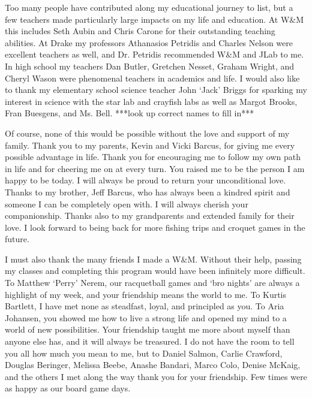 \documentclass[../main.tex]{subfiles}
\begin{document}
\begin{singlespace}
{{\begin{flushleft}
Too many people have contributed along my educational journey to list, but a few teachers made particularly large impacts on my life and education. At W$\&$M this includes Seth Aubin and Chris Carone for their outstanding teaching abilities. At Drake my professors Athanasios Petridis and Charles Nelson were excellent teachers as well, and Dr. Petridis recommended W$\&$M and JLab to me. In high school my teachers Dan Butler, Gretchen Nesset, Graham Wright, and Cheryl Wason were phenomenal teachers in academics and life. I would also like to thank my elementary school science teacher John `Jack' Briggs for sparking my interest in science with the star lab and crayfish labs as well as Margot Brooks, Fran Buesgens, and Ms. Bell. ***look up correct names to fill in***

\end{flushleft}
} %

{\parindent0pt %
\begin{flushleft}
                                                                                 
Of course, none of this would be possible without the love and support of my family. Thank you to my parents, Kevin and Vicki Barcus, for giving me every possible advantage in life. Thank you for encouraging me to follow my own path in life and for cheering me on at every turn. You raised me to be the person I am happy to be today. I will always be proud to return your unconditional love. Thanks to my brother, Jeff Barcus, who has always been a kindred spirit and someone I can be completely open with. I will always cherish your companionship. Thanks also to my grandparents and extended family for their love. I look forward to being back for more fishing trips and croquet games in the future.

\end{flushleft}
} %

{\parindent0pt %
\begin{flushleft}
                                                                                 
I must also thank the many friends I made a W$\&$M. Without their help, passing my classes and completing this program would have been infinitely more difficult. To Matthew `Perry' Nerem, our racquetball games and `bro nights' are always a highlight of my week, and your friendship means the world to me. To Kurtis Bartlett, I have met none as steadfast, loyal, and principled as you. To Aria Johansen, you showed me how to live a strong life and opened my mind to a world of new possibilities. Your friendship taught me more about myself than anyone else has, and it will always be treasured. I do not have the room to tell you all how much you mean to me, but to Daniel Salmon, Carlie Crawford, Douglas Beringer, Melissa Beebe, Anashe Bandari, Marco Colo, Denise McKaig, and the others I met along the way thank you for your friendship. Few times were as happy as our board game days.


\end{flushleft}}}
\end{singlespace}
\end{document}
